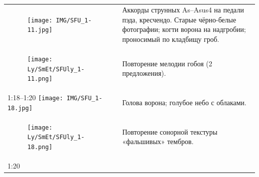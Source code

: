 \begin{longtable}[]{@{}ll@{}}
\begin{minipage}[t]{0.48\columnwidth}
\begin{figure}
\centering
\texttt{[image: IMG/SFU\_1-11.jpg]}
\caption{}
\end{figure}
\strut
\end{minipage} & \begin{minipage}[t]{0.48\columnwidth}\raggedright\strut
Аккорды струнных As--Asus4 на педали пэда, кресчендо.
Старые чёрно-белые фотографии; когти ворона на
надгробии; проносимый по кладбищу гроб.\strut
\end{minipage}\tabularnewline
\begin{minipage}[t]{0.32\columnwidth}\raggedright\strut
\begin{figure}
\centering
\texttt{[image: Ly/SmEt/SFUly\_1-11.png]}
\caption{}
\end{figure}
\strut
\end{minipage} & \begin{minipage}[t]{0.62\columnwidth}\raggedright\strut
Повторение мелодии гобоя (2 предложения).\strut
\end{minipage}\tabularnewline
\begin{minipage}[t]{0.32\columnwidth}\raggedright\strut
1:18--1:20
\texttt{[image: IMG/SFU\_1-18.jpg]}\strut
\end{minipage} & \begin{minipage}[t]{0.62\columnwidth}\raggedright\strut
Голова ворона; голубое небо с облаками.\strut
\end{minipage}\tabularnewline
\begin{minipage}[t]{0.32\columnwidth}\raggedright\strut
\begin{figure}
\centering
\texttt{[image: Ly/SmEt/SFUly\_1-18.png]}
\caption{}
\end{figure}
\strut
\end{minipage} & \begin{minipage}[t]{0.62\columnwidth}\raggedright\strut
Повторение сонорной текстуры «фальшивых» тембров.\strut
\end{minipage}\tabularnewline
\begin{minipage}[t]{0.48\columnwidth}\raggedright\strut
1:20


\end{minipage}
\end{longtable}
